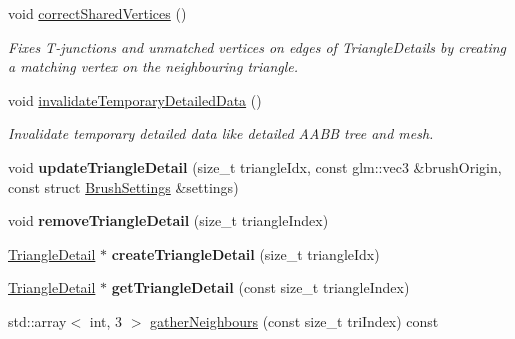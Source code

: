 \begin{DoxyCompactItemize}
void \mbox{\hyperlink{classpepr3d_1_1_geometry_aa981414573779195fbfb7a64cfcbc1f1}{correct\+Shared\+Vertices}} ()
\begin{DoxyCompactList}\small\item\em Fixes T-\/junctions and unmatched vertices on edges of Triangle\+Details by creating a matching vertex on the neighbouring triangle. \end{DoxyCompactList}\item 
\mbox{\label{classpepr3d_1_1_geometry_a69f341b26bd3ebd9158648b7d35ffa10}} 
void \mbox{\hyperlink{classpepr3d_1_1_geometry_a69f341b26bd3ebd9158648b7d35ffa10}{invalidate\+Temporary\+Detailed\+Data}} ()
\begin{DoxyCompactList}\small\item\em Invalidate temporary detailed data like detailed A\+A\+BB tree and mesh. \end{DoxyCompactList}\item 
\mbox{\label{classpepr3d_1_1_geometry_adb0af51a49fc2c3086fc519afe6b913b}} 
void {\bfseries update\+Triangle\+Detail} (size\+\_\+t triangle\+Idx, const glm\+::vec3 \&brush\+Origin, const struct \mbox{\hyperlink{structpepr3d_1_1_brush_settings}{Brush\+Settings}} \&settings)
\item 
\mbox{\label{classpepr3d_1_1_geometry_a8c14c117f916e93e9578087dd85fe3ef}} 
void {\bfseries remove\+Triangle\+Detail} (size\+\_\+t triangle\+Index)
\item 
\mbox{\label{classpepr3d_1_1_geometry_a3f3506ff18e87cd35469c89a7d7a71f3}} 
\mbox{\hyperlink{classpepr3d_1_1_triangle_detail}{Triangle\+Detail}} $\ast$ {\bfseries create\+Triangle\+Detail} (size\+\_\+t triangle\+Idx)
\item 
\mbox{\label{classpepr3d_1_1_geometry_a6b287e4fe195a2b1d74690ca4c387b95}} 
\mbox{\hyperlink{classpepr3d_1_1_triangle_detail}{Triangle\+Detail}} $\ast$ {\bfseries get\+Triangle\+Detail} (const size\+\_\+t triangle\+Index)
\item 
\mbox{\label{classpepr3d_1_1_geometry_aeabf9a91453ddd3d744ccbc862583874}} 
std\+::array$<$ int, 3 $>$ \mbox{\hyperlink{classpepr3d_1_1_geometry_aeabf9a91453ddd3d744ccbc862583874}{gather\+Neighbours}} (const size\+\_\+t tri\+Index) const

\end{DoxyCompactItemize}
